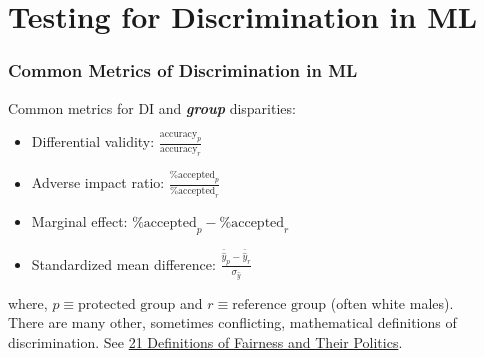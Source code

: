 \documentclass[11pt,aspectratio=169,hyperref={colorlinks}]{beamer}
\begin{document}
	\section{Testing for Discrimination in ML}

		\begin{frame}				
		
			\frametitle{Common Metrics of Discrimination in ML}
			
			Common metrics for DI and \textbf{\textit{group}} disparities:\\
			\begin{itemize}
				\item Differential validity: $\frac{\text{accuracy}_p}{\text{accuracy}_r}$
				\item Adverse impact ratio: $\frac{\text{\% accepted}_p }{ \text{\% accepted}_r}$ 
				\item Marginal effect: $\text{\% accepted}_p - \text{\% accepted}_r$
				\item Standardized mean difference: $\frac{\bar{\hat{y}}_p - \bar{\hat{y}}_r}{\sigma_{\hat{y}}}$
			\end{itemize}
			\noindent 
			\scriptsize{where, $p \equiv \text{protected group}$ and $r \equiv \text{reference group}$ (often white males).}\\
			\vspace{5pt}
			\normalsize{There are many other, sometimes conflicting, mathematical definitions of discrimination. 
				See \href{https://www.youtube.com/watch?v=wqamrPkF5kk}{21 Definitions of Fairness and Their Politics}.}
			
		\end{frame}
	
\end{document}
